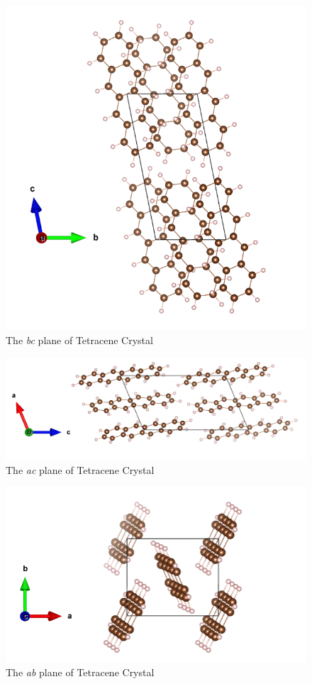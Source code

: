  \begin{figure}[h]
 	\centering
 	\includegraphics[scale=0.6]{image/T-a}
 	\caption{The \textit{bc} plane of Tetracene Crystal}  \label{tetra-crystal-a}
 \end{figure}
 
 \begin{figure}[h]
 	\centering
 	\includegraphics[scale=0.6]{image/T-b}
 	\caption{The \textit{ac} plane of Tetracene Crystal} \label{tetra-crystal-b}
 \end{figure}
 
 \begin{figure}[h]
 	\centering
 	\includegraphics[scale=0.6]{image/T-c}
 	\caption{The \textit{ab} plane of Tetracene Crystal}  \label{tetra-crystal-c}
 \end{figure}
 
